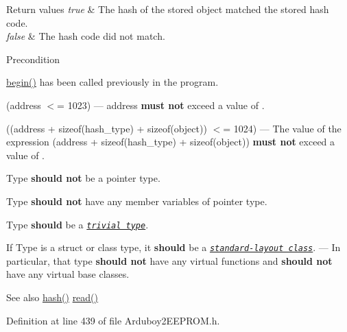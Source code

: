 \begin{DoxyRetVals}{Return values}
{\em true} & The hash of the stored object matched the stored hash code. \\
\hline
{\em false} & The hash code did not match.\\
\hline
\end{DoxyRetVals}
\begin{DoxyPrecond}{Precondition}
\begin{DoxyItemize}
\item {\ttfamily \mbox{\hyperlink{classArduboy2EEPROM_a4d482ef8e8204c56a0feba68791bc0c8}{begin()}}} has been called previously in the program. \item {\ttfamily (address $<$= 1023)} --- {\ttfamily address} {\bfseries{must not}} exceed a value of {}. \item {\ttfamily ((address + sizeof(hash\+\_\+type) + sizeof(object)) $<$= 1024)} --- The value of the expression {\ttfamily (address + sizeof(hash\+\_\+type) + sizeof(object))} {\bfseries{must not}} exceed a value of {}. \item {\ttfamily Type} {\bfseries{should not}} be a pointer type. \item {\ttfamily Type} {\bfseries{should not}} have any member variables of pointer type. \item {\ttfamily Type} {\bfseries{should}} be a \href{https://en.cppreference.com/w/cpp/named_req/TrivialType}{\texttt{ {\itshape trivial type}}}. \item If {\ttfamily Type} is a {\ttfamily struct} or {\ttfamily class} type, it {\bfseries{should}} be a \href{https://en.cppreference.com/w/cpp/language/classes\#Standard-layout_class}{\texttt{ {\itshape standard-\/layout class}}}. --- In particular, that type {\bfseries{should not}} have any {\ttfamily virtual} functions and {\bfseries{should not}} have any {\ttfamily virtual} base classes.\end{DoxyItemize}

\end{DoxyPrecond}
\begin{DoxySeeAlso}{See also}
\mbox{\hyperlink{classArduboy2EEPROM_a0d81ac363020a75a0b56af7eb014f5b4}{hash()}} \mbox{\hyperlink{classArduboy2EEPROM_a6e9b09f0b94295c040204ca0cb674649}{read()}} 
\end{DoxySeeAlso}


Definition at line 439 of file Arduboy2\+E\+E\+P\+R\+O\+M.\+h.

\mbox{\label{classArduboy2EEPROM_a6b0ef10b0c2f082b2c55a6e002802512}} 
